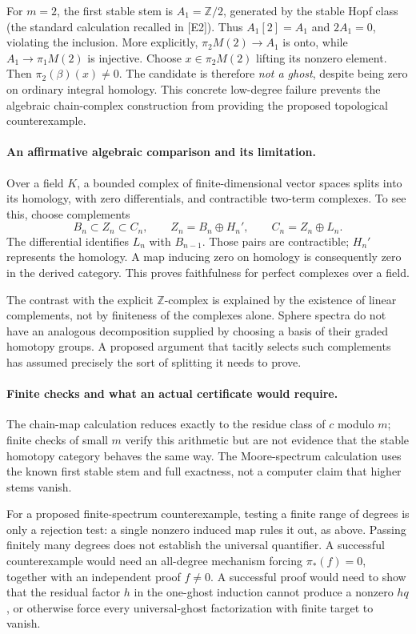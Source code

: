 \documentclass[11pt]{article}
\begin{document}
For $m=2$, the first stable stem is $A_1=\mathbb Z/2$, generated by
the stable Hopf class (the standard calculation recalled in [E2]).
Thus $A_1[2]=A_1$ and $2A_1=0$, violating the inclusion. More explicitly,
$\pi_2M(2)\to A_1$ is onto, while
$A_1\to\pi_1M(2)$ is injective. Choose $x\in\pi_2M(2)$ lifting its
nonzero element. Then $\pi_2(\beta)(x)\ne0$.
The candidate is therefore \emph{not a ghost}, despite being zero on
ordinary integral homology. This concrete low-degree failure prevents
the algebraic chain-complex construction from providing the proposed
topological counterexample.

\paragraph{An affirmative algebraic comparison and its limitation.}
Over a field $K$, a bounded complex of finite-dimensional vector spaces
splits into its homology, with zero differentials, and contractible
two-term complexes. To see this, choose complements
\[
 B_n\subset Z_n\subset C_n,
 \qquad Z_n=B_n\oplus H_n',\qquad C_n=Z_n\oplus L_n.
\]
The differential identifies $L_n$ with $B_{n-1}$. Those pairs are
contractible; $H_n'$ represents the homology. A map inducing zero on
homology is consequently zero in the derived category. This proves
faithfulness for perfect complexes over a field.

The contrast with the explicit $\mathbb Z$-complex is explained by the
existence of linear complements, not by finiteness of the complexes
alone. Sphere spectra do not have an analogous decomposition supplied
by choosing a basis of their graded homotopy groups. A proposed argument
that tacitly selects such complements has assumed precisely the sort of
splitting it needs to prove.

\paragraph{Finite checks and what an actual certificate would require.}
The chain-map calculation reduces exactly to the residue class of $c$
modulo $m$; finite checks of small $m$ verify this arithmetic but are not
evidence that the stable homotopy category behaves the same way. The
Moore-spectrum calculation uses the known first stable stem and full
exactness, not a computer claim that higher stems vanish.

For a proposed finite-spectrum counterexample, testing a finite range
of degrees is only a rejection test: a single nonzero induced map rules
it out, as above. Passing finitely many degrees does not establish the
universal quantifier. A successful counterexample would need an
all-degree mechanism forcing $\pi_*(f)=0$, together with an independent
proof $f\ne0$. A successful proof would need to show that the residual
factor $h$ in the one-ghost induction cannot produce a nonzero $hq$, or
otherwise force every universal-ghost factorization with finite target
to vanish.
\end{document}
